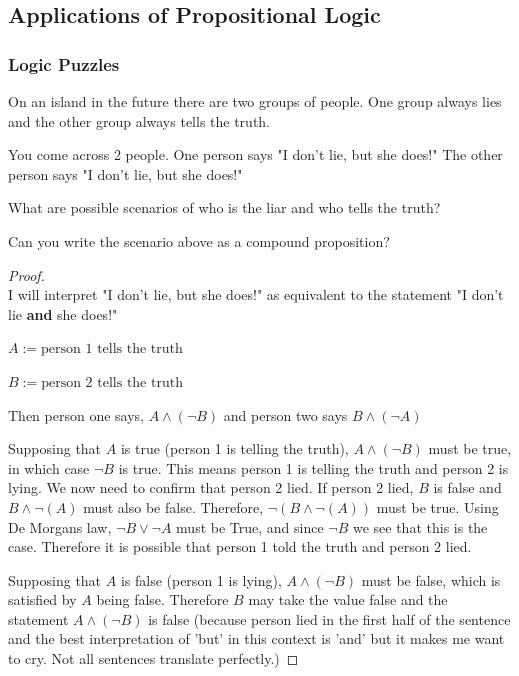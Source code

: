 \newpage
\subsection{Applications of Propositional Logic}

\subsubsection{Logic Puzzles}
\begin{exmp}

On an island in the future there are two groups of people. One group always lies and the other group always tells the truth.

You come across 2 people.
One person says "I don't lie, but she does!"
The other person says "I don't lie, but she does!"

What are possible scenarios of who is the liar and who tells the truth?

Can you write the scenario above as a compound proposition?

\begin{proof} \ \\
I will interpret "I don't lie, but she does!" as equivalent to the statement "I don't lie \textbf{and} she does!"

$A:=\text{person 1 tells the truth}$

$B:=\text{person 2 tells the truth}$

Then person one says, $A\land (\lnot B)$
and person two says $B\land (\lnot A)$

Supposing that $A$ is true (person 1 is telling the truth), $A\land (\lnot B)$ must be true, in which case $\lnot B $ is true. This means person 1 is telling the truth and person 2 is lying. 
We now need to confirm that person 2 lied. If person 2 lied, $B$ is false and $B \land \lnot(A)$ must also be false. Therefore, $\lnot(B \land \lnot(A))$ must be true. Using De Morgans law, $\lnot B \lor \lnot A$ must be True, and since $\lnot B$ we see that this is the case. Therefore it is possible that person 1 told the truth and person 2 lied.

Supposing that $A$ is false (person 1 is lying), $A\land (\lnot B)$ must be false, which is satisfied by $A$ being false. Therefore $B$ may take the value false and the statement $A\land (\lnot B)$ is false (because person lied in the first half of the sentence and the best interpretation of 'but' in this context is 'and' but it makes me want to cry. Not all sentences translate perfectly.)

\end{proof}

\end{exmp}

